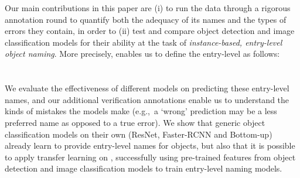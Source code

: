 Our main contributions in this paper are (i) to run the \mn data through a rigorous annotation round to quantify both the adequacy of its names and the types of errors they contain, in order to (ii) test and compare object detection and image classification models for their ability at the task of \emph{instance-based, entry-level object naming}. More precisely, \mn enables us to define the entry-level as follows:\\
\\\\
We evaluate the effectiveness of different models on predicting these entry-level names, and our additional verification annotations enable us to understand the kinds of mistakes the models make (e.g.,~a `wrong' prediction may be a less preferred name as opposed to a true error).
We show that generic object classification models on their own (ResNet, Faster-RCNN and Bottom-up) already learn to provide entry-level names for objects, but also that it is possible to apply transfer learning on \mn, successfully using pre-trained features from object detection and image classification models to train entry-level naming models. 


%


\iffalse


